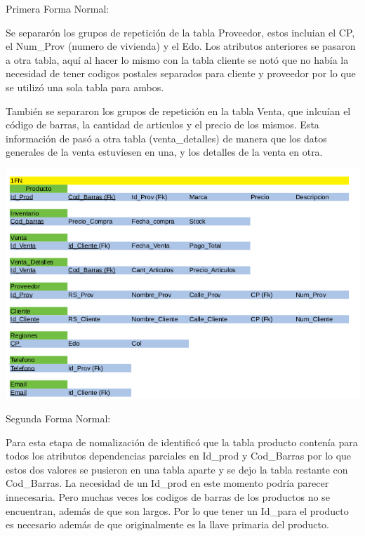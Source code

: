\documentclass[12pt, letterpaper]{article}     %
\begin{document}
	Primera Forma Normal:
	
	Se separarón los grupos de repetición de la tabla Proveedor, estos incluian el CP, el Num\_Prov (numero de vivienda) y el Edo. Los atributos anteriores se pasaron a otra tabla, aquí al hacer lo mismo con la tabla cliente se notó que no había la necesidad de tener codigos postales separados para cliente y proveedor por lo que se utilizó una sola tabla para ambos.
	
	También se separaron los grupos de repetición en la tabla Venta, que inlcuían el código de barras, la cantidad de articulos y el precio de los mismos. Esta información de pasó a otra tabla (venta\_detalles) de manera que los datos generales de la venta estuviesen en una, y los detalles de la venta en otra.
	
	\vspace{5mm} %
	\begin{center}
   	\includegraphics[scale=0.45]{tabla1N}
	\end{center}
	
	Segunda Forma Normal:
	
	Para esta etapa de nomalización de identificó que la tabla producto contenía para todos los atributos dependencias parciales en Id\_prod y Cod\_Barras por lo que estos dos valores se pusieron en una tabla aparte y se dejo la tabla restante con Cod\_Barras. La necesidad de un Id\_prod en este momento podría parecer innecesaria. Pero muchas veces los codigos de barras de los productos no se encuentran, además de que son largos. Por lo que tener un Id\_para el producto es necesario además de que originalmente es la llave primaria del producto.
\end{document}
